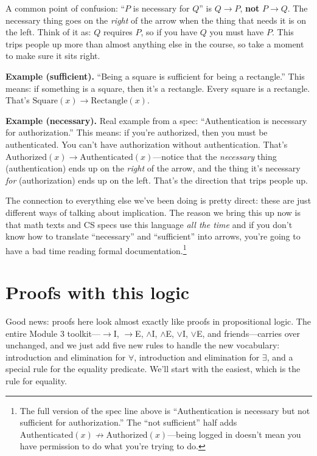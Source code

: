\documentclass[11pt]{article}
\begin{document}
A common point of confusion: ``$P$ is necessary for $Q$'' is $Q \to P$, \textbf{not} $P \to Q$. The necessary thing goes on the \emph{right} of the arrow when the thing that needs it is on the left. Think of it as: $Q$ requires $P$, so if you have $Q$ you must have $P$. This trips people up more than almost anything else in the course, so take a moment to make sure it sits right.

\textbf{Example (sufficient).} ``Being a square is sufficient for being a rectangle.'' This means: if something is a square, then it's a rectangle. Every square is a rectangle. That's $\text{Square}(x) \to \text{Rectangle}(x)$.

\textbf{Example (necessary).} Real example from a spec: ``Authentication is necessary for authorization.'' This means: if you're authorized, then you must be authenticated. You can't have authorization without authentication. That's $\text{Authorized}(x) \to \text{Authenticated}(x)$---notice that the \emph{necessary} thing (authentication) ends up on the \emph{right} of the arrow, and the thing it's necessary \emph{for} (authorization) ends up on the left. That's the direction that trips people up.

The connection to everything else we've been doing is pretty direct: these are just different ways of talking about implication. The reason we bring this up now is that math texts and CS specs use this language \emph{all the time} and if you don't know how to translate ``necessary'' and ``sufficient'' into arrows, you're going to have a bad time reading formal documentation.\footnote{The full version of the spec line above is ``Authentication is necessary but not sufficient for authorization.'' The ``not sufficient'' half adds $\text{Authenticated}(x) \not\to \text{Authorized}(x)$---being logged in doesn't mean you have permission to do what you're trying to do.}

\section{Proofs with this logic}
Good news: proofs here look almost exactly like proofs in propositional logic. The entire Module 3 toolkit---$\to$I, $\to$E, $\wedge$I, $\wedge$E, $\vee$I, $\vee$E, and friends---carries over unchanged, and we just add five new rules to handle the new vocabulary: introduction and elimination for $\forall$, introduction and elimination for $\exists$, and a special rule for the equality predicate. We'll start with the easiest, which is the rule for equality.
\end{document}
